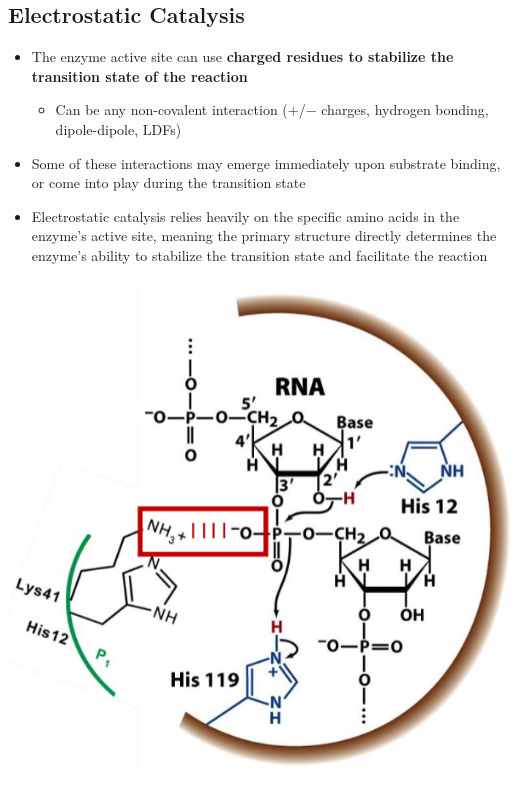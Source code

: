 \documentclass[10pt]{article}
\begin{document}
\subsection*{Electrostatic Catalysis}
\begin{itemize}
    \item The enzyme active site can use \textbf{charged residues to stabilize the transition state of the reaction}
    \begin{itemize}
        \item Can be any non-covalent interaction ($+$/$-$ charges, hydrogen bonding, dipole-dipole, LDFs)
    \end{itemize}
    \item Some of these interactions may emerge immediately upon substrate binding, or come into play during the transition state
    \item Electrostatic catalysis relies heavily on the specific amino acids in the enzyme's active site, meaning the primary structure directly determines the enzyme's ability to stabilize the transition state and facilitate the reaction
\end{itemize}
\begin{center}
    \includegraphics*[scale=0.8]{L2_16.png} 
\end{center}
\end{document}
